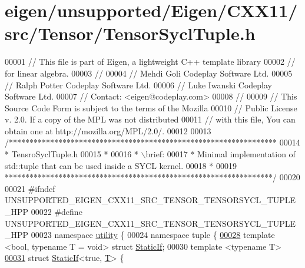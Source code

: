 \hypertarget{eigen_2unsupported_2_eigen_2_c_x_x11_2src_2_tensor_2_tensor_sycl_tuple_8h_source}{}\section{eigen/unsupported/\+Eigen/\+C\+X\+X11/src/\+Tensor/\+Tensor\+Sycl\+Tuple.h}
\label{eigen_2unsupported_2_eigen_2_c_x_x11_2src_2_tensor_2_tensor_sycl_tuple_8h_source}

\begin{DoxyCode}
00001 \textcolor{comment}{// This file is part of Eigen, a lightweight C++ template library}
00002 \textcolor{comment}{// for linear algebra.}
00003 \textcolor{comment}{//}
00004 \textcolor{comment}{// Mehdi Goli    Codeplay Software Ltd.}
00005 \textcolor{comment}{// Ralph Potter  Codeplay Software Ltd.}
00006 \textcolor{comment}{// Luke Iwanski  Codeplay Software Ltd.}
00007 \textcolor{comment}{// Contact: <eigen@codeplay.com>}
00008 \textcolor{comment}{//}
00009 \textcolor{comment}{// This Source Code Form is subject to the terms of the Mozilla}
00010 \textcolor{comment}{// Public License v. 2.0. If a copy of the MPL was not distributed}
00011 \textcolor{comment}{// with this file, You can obtain one at http://mozilla.org/MPL/2.0/.}
00012 
00013 \textcolor{comment}{/*****************************************************************}
00014 \textcolor{comment}{ * TensroSyclTuple.h}
00015 \textcolor{comment}{ *}
00016 \textcolor{comment}{ * \(\backslash\)brief:}
00017 \textcolor{comment}{ *  Minimal implementation of std::tuple that can be used inside a SYCL kernel.}
00018 \textcolor{comment}{ *}
00019 \textcolor{comment}{*****************************************************************/}
00020 
00021 \textcolor{preprocessor}{#ifndef UNSUPPORTED\_EIGEN\_CXX11\_SRC\_TENSOR\_TENSORSYCL\_TUPLE\_HPP}
00022 \textcolor{preprocessor}{#define UNSUPPORTED\_EIGEN\_CXX11\_SRC\_TENSOR\_TENSORSYCL\_TUPLE\_HPP}
00023 \textcolor{keyword}{namespace }\hyperlink{namespaceutility}{utility} \{
00024 \textcolor{keyword}{namespace }tuple \{
\hyperlink{structutility_1_1tuple_1_1_static_if}{00028} \textcolor{keyword}{template} <\textcolor{keywordtype}{bool}, \textcolor{keyword}{typename} T = \textcolor{keywordtype}{void}> \textcolor{keyword}{struct }\hyperlink{structutility_1_1tuple_1_1_static_if}{StaticIf};
00030 \textcolor{keyword}{template} <\textcolor{keyword}{typename} T>
\hyperlink{structutility_1_1tuple_1_1_static_if_3_01true_00_01_t_01_4}{00031} \textcolor{keyword}{struct }\hyperlink{structutility_1_1tuple_1_1_static_if}{StaticIf}<true, \hyperlink{group___sparse_core___module}{T}> \{

\end{DoxyCode}
